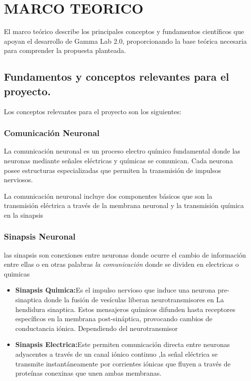 \documentclass[12pt,letterpaper]{article}
\begin{document}
\section{MARCO TEORICO}

El marco teórico describe los principales conceptos y fundamentos científicos que apoyan el desarrollo de Gamma Lab 2.0, proporcionando la base teórica necesaria para comprender la propuesta planteada.

\subsection{Fundamentos y conceptos relevantes para el proyecto.}
Los conceptos relevantes para el proyecto son los siguientes:

\subsubsection{Comunicación Neuronal}

La comunicación neuronal es un proceso electro químico fundamental donde las neuronas mediante señales eléctricas y químicas se comunican. Cada neurona posee estructuras especializadas que permiten la transmisión de impulsos nerviosos.

La comunicación neuronal incluye dos componentes básicos que son la transmisión eléctrica a través de la membrana neuronal y la transmisión química en la sinapsis \cite{morris_31_2025}


\subsubsection{Sinapsis Neuronal}
las sinapsis son conexiones entre neuronas donde ocurre el cambio de información entre ellas o en otras palabras \textit{la comunicación} donde se dividen en electricas o quimicas \cite{wu_neuronal_2015}

\begin{itemize}
    \item \textbf{Sinapsis Quimica:}Es el impulso nervioso que induce una neurona pre-sinaptica donde la fusión de vesículas liberan neurotransmisores en La hendidura sinaptica. Estos mensajeros químicos difunden hasta receptores específicos en la membrana post-sináptica, provocando cambios de conductancia iónica. Dependiendo del neurotransmisor\cite{wu_neuronal_2015}
    \item \textbf{Sinapsis Electrica:}Este permiten comunicación directa entre neuronas adyacentes a través de un canal iónico continuo ,la señal eléctrica se transmite instantáneamente por corrientes iónicas que fluyen a través de proteínas conexinas que unen ambas membranas.\cite{wu_neuronal_2015}
\end{itemize}
\end{document}
